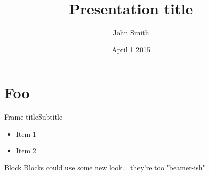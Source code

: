 \documentclass[xcolor=rgb]{beamer}
\title{Presentation title}
\author{John Smith}
\institute{University of College}
\date{April 1 2015}
\begin{document}
\maketitle

\section{Foo}

\begin{frame}{Frame title}{Subtitle}
  \begin{itemize}
  \item Item 1
  \item Item 2
  \end{itemize}

  \begin{block}{Block}
    Blocks could use some new look... they're too "beamer-ish"
  \end{block}
\end{frame}
\end{document}
